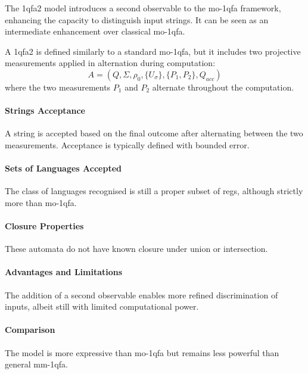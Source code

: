 \subsubsection{}
The \gls{1qfa2} model introduces a second observable to the \gls{mo-1qfa} framework, enhancing the capacity to distinguish input strings. It can be seen as an intermediate enhancement over classical \gls{mo-1qfa}.

\begin{definition}
A \gls{1qfa2} is defined similarly to a standard \gls{mo-1qfa}, but it includes two projective measurements applied in alternation during computation:
\[
A = (Q, \Sigma, \rho_0, \{U_{\sigma}\}, \{P_1, P_2\}, Q_{acc})
\]
where the two measurements \( P_1 \) and \( P_2 \) alternate throughout the computation.
\end{definition}

\paragraph{Strings Acceptance}
A string is accepted based on the final outcome after alternating between the two measurements. Acceptance is typically defined with bounded error.

\paragraph{Sets of Languages Accepted}
The class of languages recognised is still a proper subset of \glspl{reg}, although strictly more than \gls{mo-1qfa}.

\paragraph{Closure Properties}
These automata do not have known closure under union or intersection.

\paragraph{Advantages and Limitations}
The addition of a second observable enables more refined discrimination of inputs, albeit still with limited computational power.

\paragraph{Comparison}
The model is more expressive than \gls{mo-1qfa} but remains less powerful than general \gls{mm-1qfa}.


